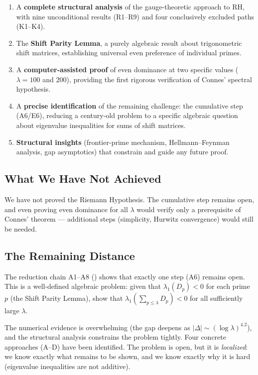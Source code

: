 \documentclass[12pt,a4paper]{article}
\theoremstyle{definition}
\theoremstyle{remark}
\begin{document}
\begin{enumerate}
  \item A \textbf{complete structural analysis} of the gauge-theoretic approach to RH, with nine unconditional results (R1--R9) and four conclusively excluded paths (K1--K4).

  \item The \textbf{Shift Parity Lemma}, a purely algebraic result about trigonometric shift matrices, establishing universal even preference of individual primes.

  \item A \textbf{computer-assisted proof} of even dominance at two specific values ($\lambda = 100$ and $200$), providing the first rigorous verification of Connes' spectral hypothesis.

  \item A \textbf{precise identification} of the remaining challenge: the cumulative step (A6/E6), reducing a century-old problem to a specific algebraic question about eigenvalue inequalities for sums of shift matrices.

  \item \textbf{Structural insights} (frontier-prime mechanism, Hellmann--Feynman analysis, gap asymptotics) that constrain and guide any future proof.
\end{enumerate}

\subsection{What We Have Not Achieved}

We have not proved the Riemann Hypothesis. The cumulative step remains open, and even proving even dominance for all $\lambda$ would verify only a prerequisite of Connes' theorem --- additional steps (simplicity, Hurwitz convergence) would still be needed.

\subsection{The Remaining Distance}

The reduction chain A1--A8 () shows that exactly one step (A6) remains open. This is a well-defined algebraic problem: given that $\lambda_1(D_p) < 0$ for each prime $p$ (the Shift Parity Lemma), show that $\lambda_1(\sum_{p \leq \lambda} D_p) < 0$ for all sufficiently large $\lambda$.

The numerical evidence is overwhelming (the gap deepens as $|\Delta| \sim (\log\lambda)^{4.2}$), and the structural analysis constrains the problem tightly. Four concrete approaches (A--D) have been identified. The problem is open, but it is \emph{localized}: we know exactly what remains to be shown, and we know exactly why it is hard (eigenvalue inequalities are not additive).
\end{document}
